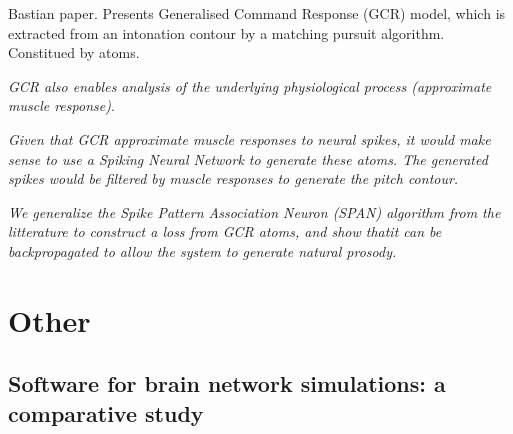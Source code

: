 \documentclass[12pt]{article}
\begin{document}
Bastian paper. Presents Generalised Command Response (GCR) model, which is extracted from an intonation contour by a matching pursuit algorithm. Constitued by atoms. 

\textit{GCR also enables analysis of the underlying physiological process (approximate muscle response)}.

\textit{Given that GCR approximate muscle responses to neural spikes, it would make sense to use a Spiking Neural Network to generate these atoms. The generated spikes would be filtered by muscle responses to generate the pitch contour.}

\textit{We generalize  the Spike Pattern Association Neuron (SPAN) algorithm from the litterature to construct a loss from GCR atoms, and show thatit can be backpropagated to allow the system to generate natural prosody.}

\section{Other}
\subsection{Software for brain network simulations: a comparative study \cite{tikidji2017software}}





\end{document}

